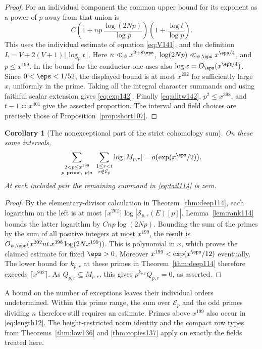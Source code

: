 \documentclass[a4paper,11pt]{article}
\newtheorem{corollary}[proposition]{Corollary}
\theoremstyle{definition}
\theoremstyle{remark}
\numberwithin{equation}{section}
\begin{document}
\begin{proof}
For an individual component the common upper bound for its
exponent as a power of \(p\) away from that union is
\[
  C\left(1+n p\,\frac{\log(2Np)}{\log p}\right)
                   \left(1+\frac{\log t}{\log p}\right).
\]
This uses the individual estimate of equation \ref{eq:V141}, and
the definition \(L=V+2(V+1)\lfloor\log_p t\rfloor\).
Here \(n\ll_\psi x^{2+8\eps}\),
\(\log(2Np)\ll_{\psi,\eps}x^{\eps/4}\), and \(p\le x^{199}\).
In the bound for the conductor one uses also
\(\log x=O_\eps(x^{\eps/4})\).
Since \(0<\eps<1/52\), the displayed bound is at most
\(x^{202}\) for sufficiently large \(x\), uniformly in the
prime. Taking all the integral character summands and using
faithful scalar extension gives \eqref{eq:exp142}. Finally
\eqref{eq:alltw142}, \(p^2\le x^{398}\), and \(t-1\asymp
x^{401}\) give the asserted proportion. The interval and field
choices are precisely those of Proposition~\ref{prop:short107}.
\end{proof}

\begin{corollary}[The nonexceptional part of the strict cohomology sum]
\leavevmode\label{cor:full142}
On these same intervals,
\[
 \sum_{\substack{2<p\le x^{199}\\p\ \mathrm{prime},\ p\nmid n}}
    \ \sum_{\substack{1\le r<t\\r\notin\mathcal E_p}}
                   \log|M_{p,r}|=o\bigl(\exp(x^\eps/2)\bigr).
\]
At each included pair the remaining summand in
\eqref{eq:tail114} is zero.
\end{corollary}
\begin{proof}
By the elementary-divisor calculation in
Theorem~\ref{thm:deep114}, each logarithm on the left is at
most \(\lceil x^{202}\rceil\log|\mathcal S_{p,r}(E)[p]|\).
Lemma~\ref{lem:rank114} bounds the latter logarithm by
\(Cnp\log(2Np)\). Bounding the sum of the primes by the sum
of all positive integers at most \(x^{199}\), the result is
\(O_{\psi,\eps}(x^{202}nt\,x^{398}\log(2N x^{199}))\).
This is polynomial in \(x\), which proves the claimed estimate
for fixed \(\eps>0\). Moreover \(x^{199}<\exp(x^\eps/12)\)
eventually. The lower bound for \(k_{p,r}\) at these primes in
Theorem~\ref{thm:deep114} therefore exceeds \(\lceil x^{202}\rceil\).
As \(Q_{p,r}\subseteq M_{p,r}\), this gives
\(p^{k_{p,r}}Q_{p,r}=0\), as asserted.
\end{proof}

A bound on the number of exceptions leaves their individual
orders undetermined. Within this prime range, the sum over
\(\mathcal E_p\) and the odd primes dividing \(n\) therefore
still requires an estimate. Primes above \(x^{199}\) also occur
in \eqref{eq:length12}. The height-restricted norm identity and
the compact row types from Theorems~\ref{thm:low136} and
\ref{thm:copies137} apply on exactly the fields treated here.
\end{document}
